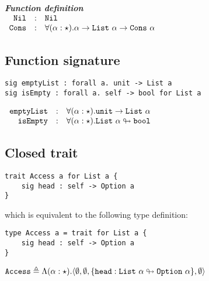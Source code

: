 \documentclass{article}[11pt]
\newcommand{\subsubsubsection}[1]
{
    ~\\
    {\bf {\em #1}} \\
}
\newcommand{\term}[1]{\verb~#1~}
\begin{document}
    \subsubsubsection{Function definition}

    \noindent
    \begin{math}
        \begin{array}{rclp{5cm}}
            \term{Nil}  & : & \term{Nil}                                                                                   \\
            \term{Cons} & : & \forall(\alpha:\star).\alpha \rightarrow \term{List}~\alpha \rightarrow \term{Cons} ~ \alpha \\
        \end{array}
    \end{math}

    \subsection{Function signature}\label{subsec:function-signature}

    \begin{verbatim}
sig emptyList : forall a. unit -> List a
sig isEmpty : forall a. self -> bool for List a
    \end{verbatim}

    \noindent
    \begin{math}
        \begin{array}{rclp{5cm}}
            \term{emptyList} & : & \forall(\alpha:\star).\term{unit} \rightarrow \term{List}~\alpha     \\
            \term{isEmpty}   & : & \forall(\alpha:\star).\term{List}~\alpha \looparrowright \term{bool}
        \end{array}
    \end{math}

    \subsection{Closed trait}\label{subsec:closed-trait}

    \begin{verbatim}
trait Access a for List a {
    sig head : self -> Option a
}
    \end{verbatim}

    which is equivalent to the following type definition:

    \begin{verbatim}
type Access a = trait for List a {
    sig head : self -> Option a
}
    \end{verbatim}

    \noindent
    \begin{math}
        \term{Access} \triangleq \Lambda(\alpha:\star).\langle
        \emptyset,
        \emptyset,
        \{ \term{head} : \term{List}~\alpha \looparrowright \term{Option}~\alpha \},
        \emptyset
        \rangle
    \end{math}
\end{document}
